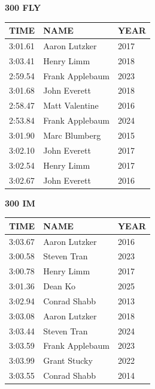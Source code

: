 \begin{table}[H]
\centering
\begin{minipage}[t]{0.48\textwidth}
\centering
\textbf{300 FLY}\\[0.1cm]
\begin{tabular}{@{}p{1.8cm}p{2.8cm}p{1.2cm}@{}}
\hline
    \textbf{TIME} & \textbf{NAME} & \textbf{YEAR} \\
\hline
    3:01.61 & Aaron Lutzker & 2017 \\
    3:03.41 & Henry Limm & 2018 \\
    2:59.54 & Frank Applebaum & 2023 \\
    3:01.68 & John Everett & 2018 \\
    2:58.47 & Matt Valentine & 2016 \\
    2:53.84 & Frank Applebaum & 2024 \\
    3:01.90 & Marc Blumberg & 2015 \\
    3:02.10 & John Everett & 2017 \\
    3:02.54 & Henry Limm & 2017 \\
    3:02.67 & John Everett & 2016 \\
\hline
\end{tabular}
\end{minipage}\hfill
\begin{minipage}[t]{0.48\textwidth}
\centering
\textbf{300 IM}\\[0.1cm]
\begin{tabular}{@{}p{1.8cm}p{2.8cm}p{1.2cm}@{}}
\hline
    \textbf{TIME} & \textbf{NAME} & \textbf{YEAR} \\
\hline
    3:03.67 & Aaron Lutzker & 2016 \\
    3:00.58 & Steven Tran & 2023 \\
    3:00.78 & Henry Limm & 2017 \\
    3:01.36 & Dean Ko & 2025 \\
    3:02.94 & Conrad Shabb & 2013 \\
    3:03.08 & Aaron Lutzker & 2018 \\
    3:03.44 & Steven Tran & 2024 \\
    3:03.59 & Frank Applebaum & 2023 \\
    3:03.99 & Grant Stucky & 2022 \\
    3:03.55 & Conrad Shabb & 2014 \\
\hline
\end{tabular}
\end{minipage}
\end{table}

